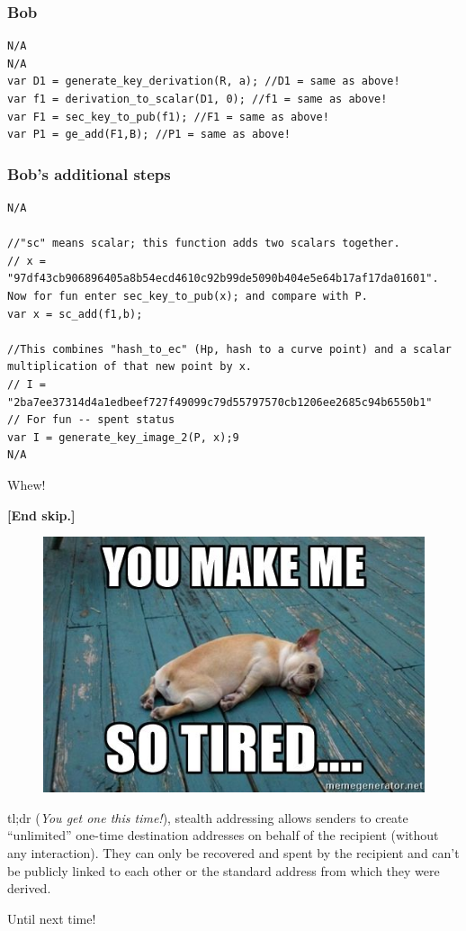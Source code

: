 \subsubsection{Bob}
\begin{lstlisting}
N/A
N/A
var D1 = generate_key_derivation(R, a); //D1 = same as above!
var f1 = derivation_to_scalar(D1, 0); //f1 = same as above!
var F1 = sec_key_to_pub(f1); //F1 = same as above!
var P1 = ge_add(F1,B); //P1 = same as above!
\end{lstlisting}
\subsubsection{Bob's additional steps}
\begin{lstlisting}
N/A

//"sc" means scalar; this function adds two scalars together. 
// x = "97df43cb906896405a8b54ecd4610c92b99de5090b404e5e64b17af17da01601". Now for fun enter sec_key_to_pub(x); and compare with P.
var x = sc_add(f1,b); 

//This combines "hash_to_ec" (Hp, hash to a curve point) and a scalar multiplication of that new point by x. 
// I = "2ba7ee37314d4a1edbeef727f49099c79d55797570cb1206ee2685c94b6550b1" 
// For fun -- spent status
var I = generate_key_image_2(P, x);9 
N/A
\end{lstlisting}
Whew!

\textbf{[End skip.]}
\begin{figure}[H]
	\centering
	\includegraphics[width=0.8\linewidth]{./images/blog-series/xmr-crypto-luigi1111/tired-dog.jpg}
\end{figure}
tl;dr (\emph{You get one this time!}), stealth addressing allows senders to create ``unlimited'' one-time destination addresses on behalf of the recipient (without any interaction). They can only be recovered and spent by the recipient and can't be publicly linked to each other or the standard address from which they were derived.\par

Until next time!
